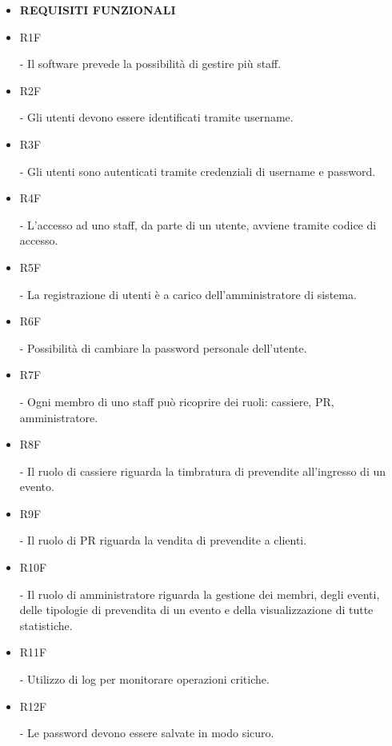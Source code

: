 \documentclass[a4paper]{article}
\begin{document}
\begin{itemize}
	
	\item \textbf{REQUISITI FUNZIONALI}
		
	\item \hypertarget{R1F}{R1F} - Il software prevede la possibilità di gestire più staff.
	
	
	\item \hypertarget{R2F}{R2F} - Gli utenti devono essere identificati tramite username.
	
	\item \hypertarget{R3F}{R3F} - Gli utenti sono autenticati tramite credenziali di username e password.
	\item \hypertarget{R4F}{R4F} - L'accesso ad uno staff, da parte di un utente, avviene tramite codice di accesso.	

	\item \hypertarget{R5F}{R5F} - La registrazione di utenti è a carico dell'amministratore di sistema.
	\item \hypertarget{R6F}{R6F} - Possibilità di cambiare la password personale dell'utente.
		
	\item \hypertarget{R7F}{R7F} - Ogni membro di uno staff può ricoprire dei ruoli: cassiere, PR, amministratore.	
	\item \hypertarget{R8F}{R8F} - Il ruolo di cassiere riguarda la timbratura di prevendite all'ingresso di un evento.
	\item \hypertarget{R9F}{R9F} - Il ruolo di PR riguarda la vendita di prevendite a clienti.
	\item \hypertarget{R10F}{R10F} - Il ruolo di amministratore riguarda la gestione dei membri, degli eventi, delle tipologie di prevendita di un evento e della visualizzazione di tutte statistiche.
	
	\item \hypertarget{R11F}{R11F} - Utilizzo di log per monitorare operazioni critiche.

	\item \hypertarget{R12F}{R12F} - Le password devono essere salvate in modo sicuro.
	
	

\end{itemize}
\end{document}
